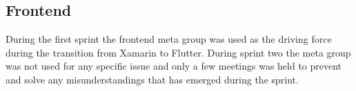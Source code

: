\subsection{Frontend}
During the first sprint the frontend meta group was used as the driving force during the transition from Xamarin to Flutter.
During sprint two the meta group was not used for any specific issue and only a few meetings was held to prevent and solve any misunderstandings that has emerged during the sprint.